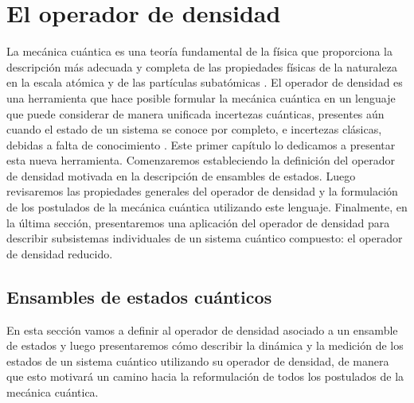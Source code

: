 \chapter{El operador de densidad} %
La mecánica cuántica es una teoría fundamental de la física que
proporciona la descripción más adecuada y completa de las propiedades
físicas de la naturaleza en la escala atómica y de las partículas 
subatómicas \cite{feynman1965feyman}. 
El operador de densidad es una herramienta
que hace posible formular la mecánica cuántica en un lenguaje
que puede considerar de manera unificada incertezas cuánticas, 
presentes aún cuando el estado de un sistema se conoce 
por completo, e incertezas clásicas, 
debidas a falta de conocimiento \cite{sakurai_napolitano_2017}.
Este primer capítulo lo dedicamos a presentar esta nueva herramienta.
Comenzaremos estableciendo la definición del operador de densidad
motivada en la descripción de ensambles de estados. Luego
revisaremos las propiedades generales del operador de densidad y la 
formulación de los postulados de la mecánica cuántica utilizando este
lenguaje. Finalmente, en la última sección, presentaremos una aplicación 
del operador de densidad para describir subsistemas individuales 
de un sistema cuántico compuesto: el operador de densidad reducido.



\section{Ensambles de estados cuánticos} %
En esta sección vamos a definir al operador de densidad asociado a 
un ensamble de estados y luego presentaremos cómo describir la dinámica
y la medición de los estados de un sistema cuántico utilizando 
su operador de densidad, 
de manera que esto motivará un camino hacia la reformulación
de todos los postulados de la mecánica cuántica.


